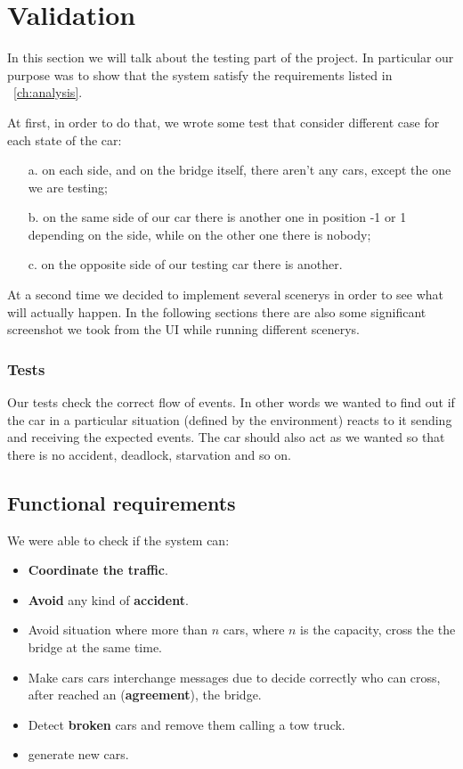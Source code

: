 \chapter{Validation}\label{ch:validation}
In this section we will talk about the testing part of the project. In particular our purpose was to 
show that the system satisfy the requirements listed in ~\ref{ch:analysis}. \\
\noindent

At first, in order to do that, we wrote some test that consider different case for each state of the car:
\begin{itemize}
    \item [a.] on each side, and on the bridge itself, there aren't any cars, except the one we are testing;
    \item [b.] on the same side of our car there is another one in position -1 or 1 depending on the side, 
    while on the other one there is nobody;
    \item [c.] on the opposite side of our testing car there is another.
\end{itemize}

At a second time we decided to implement several scenerys in order to see what will actually happen. 
In the following sections there are also some significant screenshot we took from the UI while running 
different scenerys.

\subsection{Tests}
\noindent

Our tests check the correct flow of events. In other words we wanted to find out if the car in a 
particular situation (defined by the environment) reacts to it sending and receiving the expected
events. The car should also act as we wanted so that there is no accident, deadlock, starvation and so on.

\section{Functional requirements}

We were able to check if the system can:
\begin{itemize}
    \item \textbf{Coordinate the traffic}.
    \item \textbf{Avoid} any kind of \textbf{accident}.
    \item Avoid situation where more than $n$ cars, where $n$ is the capacity, cross the the bridge at 
    the same time.
    \item Make cars cars interchange messages due to decide correctly who can cross, after reached an
    (\textbf{agreement}), the bridge.
    \item Detect \textbf{broken} cars and remove them calling a tow truck.
    \item generate new cars.
\end{itemize}


